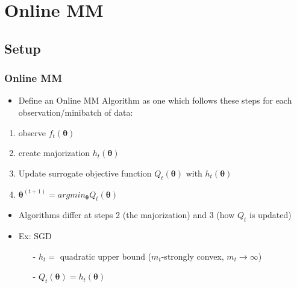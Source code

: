 \documentclass{beamer}
\newcommand{\iter}[2]{#1^{(#2)}}
\begin{document}
\section{Online MM}
\subsection{Setup}
\begin{frame}
  \frametitle{Online MM}
  \begin{itemize}
    \item Define an Online MM Algorithm as one which follows these steps for each observation/minibatch of data:
  \end{itemize}
  \begin{enumerate}
    \item observe $f_t(\bm\theta)$
    \item create majorization $h_t(\bm\theta)$
    \item Update surrogate objective function $Q_t(\bm\theta)$ with $h_t(\bm\theta)$
    \item $\iter{\bm\theta}{t+1} = argmin_{\bm\theta}Q_t(\bm\theta)$
  \end{enumerate}
\end{frame}
\begin{frame}
  \begin{itemize}
    \item Algorithms differ at steps 2 (the majorization) and 3 (how $Q_t$ is updated)
    \item Ex: SGD
    \begin{itemize}
      \item[-] $h_t=$ quadratic upper bound ($m_t$-strongly convex, $m_t\rightarrow\infty$)
      \item[-] $Q_t(\bm\theta) = h_t(\bm\theta)$
    \end{itemize}
  \end{itemize}
\end{frame}
\end{document}
